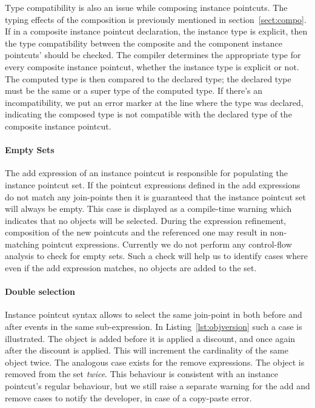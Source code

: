 Type compatibility is also an issue while composing instance pointcuts. The typing effects of the composition is previously mentioned in section~\ref{sect:compo}. If in a composite instance pointcut declaration, the instance type is explicit, then the type compatibility between the composite and the component instance pointcuts' should be checked. The compiler determines the appropriate type for every composite instance pointcut, whether the instance type is explicit or not. The computed type is then compared to the declared type; the declared type must be the same or a super type of the computed type. If there's an incompatibility, we put an error marker at the line where the type was declared, indicating the composed type is not compatible with the declared type of the composite instance pointcut. 


\paragraph*{Empty Sets} The add expression of an instance pointcut is responsible for populating the instance pointcut set. If the pointcut expressions defined in the add expressions do not match any join-points then it is guaranteed that the instance pointcut set will always be empty. This case is displayed as a compile-time warning which indicates that no objects will be selected. During the expression refinement, composition of the new pointcuts and the referenced one may result in non-matching pointcut expressions. 
Currently we do not perform any control-flow analysis to check for empty sets. Such a check will help us to identify cases where even if the add expression matches, no objects are added to the set.

\paragraph*{Double selection} Instance pointcut syntax allows to select the same join-point in both before and after events in the same sub-expression. In Listing~\ref{lst:objversion} such a case is illustrated. The  object is added before it is applied a discount, and once again after the discount is applied. This will increment the cardinality of the same object twice. The analogous case exists for the remove expressions. The object is removed from the set \emph{twice}. This behaviour is consistent with an instance pointcut's regular behaviour, but we still raise a separate warning for the add and remove cases to notify the developer, in case of a copy-paste error. 

